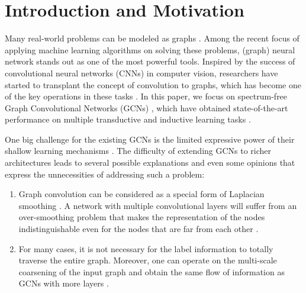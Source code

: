 \documentclass{article}
\begin{document}
\section{Introduction and Motivation}\label{sec:introduction}
Many real-world problems can be modeled as graphs \cite{hamilton2017inductive, kipf2016classification, liao2019lanczos, gilmer2017neural, monti2017geometric, defferrard2016fast}. Among the recent focus of applying machine learning algorithms on solving these problems, (graph) neural network stands out as one of the most powerful tools. Inspired by the success of convolutional neural networks (CNNs) \cite{lecun1998gradient} in computer vision, researchers have started to transplant the concept of convolution to graphs, which has become one of the key operations in these tasks \cite{li2018adaptive}. In this paper, we focus on spectrum-free Graph Convolutional Networks (GCNs) \cite{bronstein2016geometric, shuman2012emerging}, which have obtained state-of-the-art performance on multiple transductive and inductive learning tasks \cite{defferrard2016fast, kipf2016classification, liao2019lanczos, chen2018fastgcn, chen2017stochastic}.
\par
One big challenge for the existing GCNs is the limited expressive power of their shallow learning mechanisms \cite{zhang2018graph, wu2019survey}. The difficulty of extending GCNs to richer architectures leads to several possible explanations and even some opinions that express the unnecessities of addressing such a problem:
\begin{enumerate}[leftmargin=12pt]
\item Graph convolution can be considered as a special form of Laplacian smoothing \cite{li2018deeper}. A network with multiple convolutional layers will suffer from an over-smoothing problem that makes the representation of the nodes indistinguishable even for the nodes that are far from each other \cite{zhang2018graph}. %
\item For many cases, it is not necessary for the label information to totally traverse the entire graph. Moreover, one can operate on the multi-scale coarsening of the input graph and obtain the same flow of information as GCNs with more layers \cite{bronstein2016geometric}.
\end{enumerate}
\end{document}
